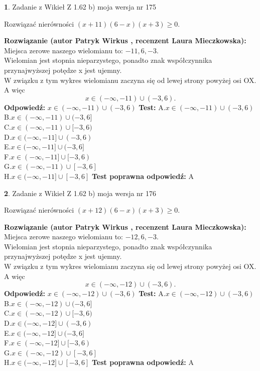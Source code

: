 \documentclass[12pt, a4paper]{article}
\theoremstyle{definition} %
\newtheorem{zad}{}
\newcommand{\zadStart}[1]{\begin{zad}#1\newline}
\newcommand{\zadStop}{\end{zad}}
\newcommand{\rozwStart}[2]{\noindent \textbf{Rozwiązanie (autor #1 , recenzent #2): }\newline}
\newcommand{\rozwStop}{\newline}
\newcommand{\odpStart}{\noindent \textbf{Odpowiedź:}\newline}
\newcommand{\odpStop}{\newline}
\newcommand{\testStart}{\noindent \textbf{Test:}\newline}
\newcommand{\testStop}{\newline}
\newcommand{\kluczStart}{\noindent \textbf{Test poprawna odpowiedź:}\newline}
\newcommand{\kluczStop}{\newline}
\begin{document}
\zadStart{Zadanie z Wikieł Z 1.62 b) moja wersja nr 175}

Rozwiązać nierówności $(x+11)(6-x)(x+3)\ge0$.
\zadStop
\rozwStart{Patryk Wirkus}{Laura Mieczkowska}
Miejsca zerowe naszego wielomianu to: $-11, 6, -3$.\\
Wielomian jest stopnia nieparzystego, ponadto znak współczynnika przy\linebreak najwyższej potędze x jest ujemny.\\ W związku z tym wykres wielomianu zaczyna się od lewej strony powyżej osi OX. A więc $$x \in (-\infty,-11) \cup (-3,6).$$
\rozwStop
\odpStart
$x \in (-\infty,-11) \cup (-3,6)$
\odpStop
\testStart
A.$x \in (-\infty,-11) \cup (-3,6)$\\
B.$x \in (-\infty,-11) \cup (-3,6]$\\
C.$x \in (-\infty,-11) \cup [-3,6)$\\
D.$x \in (-\infty,-11] \cup (-3,6)$\\
E.$x \in (-\infty,-11] \cup (-3,6]$\\
F.$x \in (-\infty,-11] \cup [-3,6)$\\
G.$x \in (-\infty,-11) \cup [-3,6]$\\
H.$x \in (-\infty,-11] \cup [-3,6]$
\testStop
\kluczStart
A
\kluczStop



\zadStart{Zadanie z Wikieł Z 1.62 b) moja wersja nr 176}

Rozwiązać nierówności $(x+12)(6-x)(x+3)\ge0$.
\zadStop
\rozwStart{Patryk Wirkus}{Laura Mieczkowska}
Miejsca zerowe naszego wielomianu to: $-12, 6, -3$.\\
Wielomian jest stopnia nieparzystego, ponadto znak współczynnika przy\linebreak najwyższej potędze x jest ujemny.\\ W związku z tym wykres wielomianu zaczyna się od lewej strony powyżej osi OX. A więc $$x \in (-\infty,-12) \cup (-3,6).$$
\rozwStop
\odpStart
$x \in (-\infty,-12) \cup (-3,6)$
\odpStop
\testStart
A.$x \in (-\infty,-12) \cup (-3,6)$\\
B.$x \in (-\infty,-12) \cup (-3,6]$\\
C.$x \in (-\infty,-12) \cup [-3,6)$\\
D.$x \in (-\infty,-12] \cup (-3,6)$\\
E.$x \in (-\infty,-12] \cup (-3,6]$\\
F.$x \in (-\infty,-12] \cup [-3,6)$\\
G.$x \in (-\infty,-12) \cup [-3,6]$\\
H.$x \in (-\infty,-12] \cup [-3,6]$
\testStop
\kluczStart
A
\kluczStop
\end{document}
